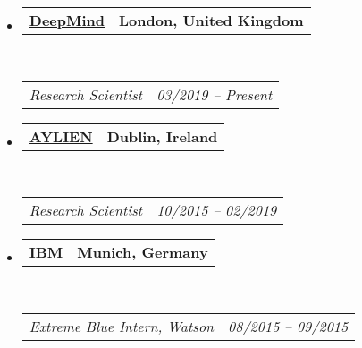 \documentclass[10pt,letterpaper]{article}
\makeatletter
\newcommand{\headerrow}[2]
{\begin{tabular*}{\linewidth}{l@{\extracolsep{\fill}}r}
	#1 &
	#2 \\
\end{tabular*}}
\makeatother
\begin{document}
\begin{itemize}
	\parskip=0.1em
	
	\item
	\headerrow
		{\textbf{\href{https://deepmind.com/}{DeepMind}}}
		{\textbf{London, United Kingdom}}
	\\
	\headerrow
		{\emph{Research Scientist}}
		{\emph{03/2019 -- Present}}
	
	\item
	\headerrow
		{\textbf{\href{http://www.aylien.com/}{AYLIEN}}}
		{\textbf{Dublin, Ireland}}
	\\
	\headerrow
		{\emph{Research Scientist}}
		{\emph{10/2015 -- 02/2019}}

	\item
	\headerrow
		{\textbf{IBM}}
		{\textbf{Munich, Germany}}
	\\
	\headerrow
		{\emph{Extreme Blue Intern, Watson}}
		{\emph{08/2015 -- 09/2015}}


\end{itemize}
\end{document}
